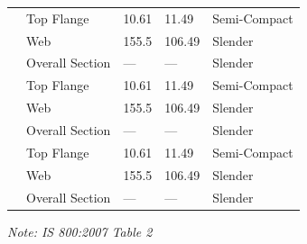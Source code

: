 \documentclass[12pt,a4paper]{report}
\numberwithin{table}{chapter}
\numberwithin{figure}{chapter}
\begin{document}
\begin{longtable}{|C{2.5cm}|L{3cm}|C{3.5cm}|C{2.5cm}|>{\centering\arraybackslash}p{4.0cm}|}
\hline
{} & Top Flange & 10.61 & 11.49 & Semi-Compact \\[6pt]
 & Web & 155.5 & 106.49 & Slender \\[6pt]
 & Overall Section & --- & --- & Slender \\[6pt]
\hline
{} & Top Flange & 10.61 & 11.49 & Semi-Compact \\[6pt]
 & Web & 155.5 & 106.49 & Slender \\[6pt]
 & Overall Section & --- & --- & Slender \\[6pt]
\hline
{} & Top Flange & 10.61 & 11.49 & Semi-Compact \\[6pt]
 & Web & 155.5 & 106.49 & Slender \\[6pt]
 & Overall Section & --- & --- & Slender \\[6pt]
\hline
\end{longtable}
\noindent\textit{Note: IS 800:2007 Table 2}
\end{document}
